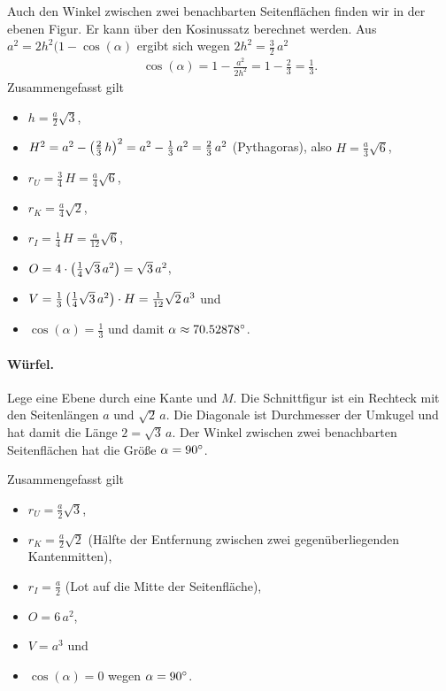 \documentclass[11pt]{article}
\begin{document}
Auch den Winkel zwischen zwei benachbarten Seitenflächen finden wir in der
ebenen Figur.  Er kann über den Kosinussatz berechnet werden. Aus
$a^2=2h^2(1-\cos(\alpha)$ ergibt sich wegen $2h^2=\frac32\,a^2$
\begin{gather*}
  \cos(\alpha)=1-\frac{a^2}{2h^2}=1-\frac23=\frac13.
\end{gather*}
Zusammengefasst gilt
\begin{itemize}
\item $h=\frac{a}{2}\sqrt{3}$,
\item $H^2=a^2-\left(\frac23\,h\right)^2=a^2-\frac13\,a^2=\frac23\,a^2$ (Pythagoras),
  also $H=\frac{a}{3}\sqrt{6}$,
\item $r_U=\frac34\,H=\frac{a}{4}\sqrt{6}$,
\item $r_K=\frac{a}{4}\sqrt{2}$, 
\item $r_I=\frac14\,H=\frac{a}{12}\sqrt{6}$,
\item $O=4\cdot \left(\frac14\sqrt{3}\,a^2\right)=\sqrt{3}\,a^2$, 
\item $V=\frac13 \left(\frac14\sqrt{3}\,a^2\right)\cdot H = \frac{1}{12}\sqrt{2}\,a^3$
  und 
\item $\cos(\alpha)=\frac13$ und damit $\alpha\approx 70.52878^{\circ}$.
\end{itemize}

\paragraph{Würfel.}
Lege eine Ebene durch eine Kante und $M$. Die Schnittfigur ist ein Rechteck
mit den Seitenlängen $a$ und $\sqrt{2}\,a$.  Die Diagonale ist Durchmesser der
Umkugel und hat damit die Länge $2=\sqrt{3}\,a$. Der Winkel zwischen zwei
benachbarten Seitenflächen hat die Größe $\alpha=90^{\circ}$.

Zusammengefasst gilt
\begin{itemize}
\item $r_U=\frac{a}{2}\sqrt{3}$, 
\item $r_K=\frac{a}{2}\sqrt{2}$ (Hälfte der Entfernung zwischen zwei
  gegenüberliegenden Kantenmitten),
\item $r_I=\frac{a}{2}$ (Lot auf die Mitte der Seitenfläche),
\item $O=6\,a^2$,
\item $V=a^3$ und
\item $\cos(\alpha)=0$ wegen $\alpha=90^{\circ}$.
\end{itemize}
\end{document}
